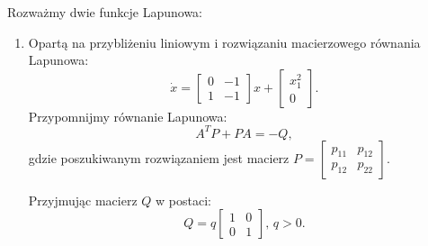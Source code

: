 \documentclass{article}
\begin{document}
        Rozważmy dwie funkcje Lapunowa:
        \begin{enumerate}
            \item Opartą na przybliżeniu liniowym i rozwiązaniu macierzowego równania Lapunowa:
            $$
                \dot{x}
                =
                \begin{bmatrix}
                    0 & -1\\
                    1 & -1
                \end{bmatrix}
                x
                +
                \begin{bmatrix}
                    x_{1}^{2}\\
                    0
                \end{bmatrix}.
            $$
            Przypomnijmy równanie Lapunowa:
            $$
                A^{T}P + PA = -Q,
            $$
            gdzie poszukiwanym rozwiązaniem jest macierz $P = \begin{bmatrix} p_{11} & p_{12} \\ p_{12} & p_{22} \end{bmatrix}$.
            

            Przyjmując macierz $Q$ w postaci:
            $$
                Q
                =
                q
                \begin{bmatrix}
                    1 & 0\\
                    0 & 1
                \end{bmatrix},\,q>0.
            $$
            

\end{enumerate}
\end{document}
